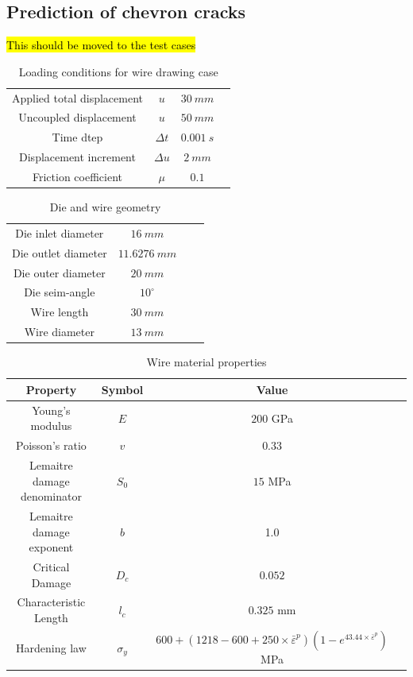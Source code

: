 \documentclass[sn-mathphys,Numbered,draft]{sn-jnl}%
\begin{document}
\subsection{Prediction of chevron cracks}

\hl{This should be moved to the test cases}

\begin{table}[htb]
	\centering
		\begin{tabular}{cccc} \hline
		    Applied total displacement & $u$ & $30\ mm$ \\
		    Uncoupled displacement & $u$ & $50\ mm$ \\
		    Time dtep & $\Delta t$ & $0.001\ s$ \\
			Displacement increment  & $\Delta u$ & $2\ mm$   \\
			Friction coefficient & $\mu$ & $0.1$ \\
			\hline
		\end{tabular}
	\caption{Loading conditions for wire drawing case}
	\label{tab:material_properties}
\end{table}

\begin{table}[htb]
	\centering
		\begin{tabular}{cccc} \hline
		    Die inlet diameter & $16\ mm$ \\
		    Die outlet diameter & $11.6276\ mm$ \\
		    Die outer diameter & $20\ mm$ \\
		    Die seim-angle & $10^{\circ}$ \\
		    Wire length & $30\ mm$ \\
		    Wire diameter & $13\ mm$ \\
			\hline
		\end{tabular}
	\caption{Die and wire geometry}
	\label{tab:material_properties}
\end{table}

\begin{table}[htb]
	\centering
		\begin{tabular}{cccc} \hline
			Property & Symbol & Value  \\ \hline 
			Young's modulus & $E$ & $200$ GPa \\
			Poisson's ratio & $v$ & $0.33$   \\
			Lemaitre damage denominator & $S_0$ & $15$ MPa  \\
			Lemaitre damage exponent & $b$ & 1.0  \\
			Critical Damage & $D_c$ & $0.052$\\
			Characteristic Length & $l_c$ & $0.325$ mm  \\
			Hardening law & $\sigma_y$ & $600+(1218-600+250\times\bar{\varepsilon}^p)(1-e^{43.44\times\bar{\varepsilon}^p})$ MPa \\
			\hline
		\end{tabular}
	\caption{Wire material properties }
	\label{tab:material_properties}
\end{table}
\end{document}

